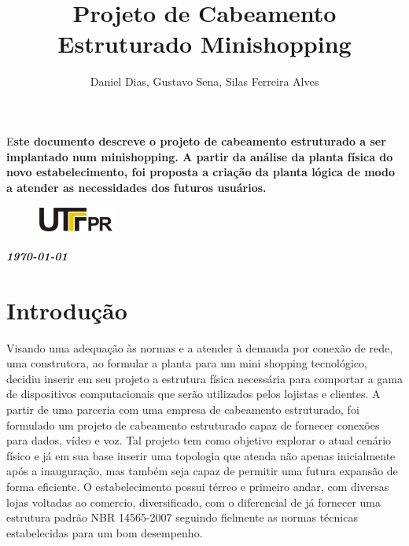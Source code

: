 \documentclass[	DIV=calc,%
							paper=a4,%
							fontsize=12pt,%
							onecolumn]{scrartcl}	 					%
\title{Projeto de Cabeamento Estruturado Minishopping}					%
\author{Daniel Dias, Gustavo Sena, Silas Ferreira Alves }  	%
\date{}																				%
\newcommand{\initial}[1]{%
     \lettrine[lines=3,lhang=0.3,nindent=0em]{
     				\color{DarkGoldenrod}
     				{\textsf{#1}}}{}}
\begin{document}
\maketitle
\thispagestyle{fancy} 	
\thispagestyle{empty}		%




\initial{E}\textbf{ste documento descreve o projeto de cabeamento estruturado a ser implantado num minishopping. 
A partir da análise da planta física do novo estabelecimento, foi proposta  a criação da planta lógica de modo a atender as necessidades dos futuros usuários.}
\begin{figure}
	\centering
	\includegraphics{utfpr}
\end{figure}

\vspace{3cm}
\centerline{\textit{\textbf{\today}}}

\clearpage
    \renewcommand*\listfigurename{Lista de figuras}
\listoffigures





\clearpage
\renewcommand{\contentsname}{Sumário}
\tableofcontents
\clearpage

\section{Introdução}
Visando uma adequação às normas e a atender à demanda por conexão de rede, uma construtora, ao formular a planta para um  mini shopping tecnológico, decidiu inserir em seu projeto a estrutura física necessária para comportar a gama de dispositivos computacionais que serão utilizados pelos lojistas e clientes.
A partir de uma parceria com uma empresa de cabeamento estruturado, foi formulado um projeto de cabeamento estruturado capaz de fornecer conexões para dados, vídeo e voz.
Tal projeto tem como objetivo explorar o atual cenário físico e já em sua base inserir uma topologia que atenda não apenas inicialmente após a inauguração, mas também seja capaz de permitir uma futura expansão de forma eficiente.
O estabelecimento possui térreo e primeiro andar, com diversas lojas voltadas ao comercio, diversificado, com o diferencial de já fornecer uma estrutura padrão NBR 14565-2007 seguindo fielmente as normas técnicas estabelecidas para um bom desempenho.
\end{document}
